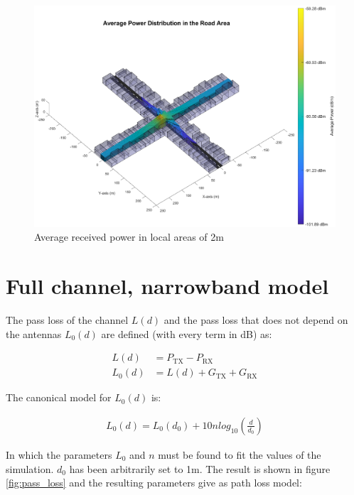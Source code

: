 \documentclass[10pt,a4paper]{ULBreport}
\begin{document}
\begin{figure}[H]
    \centering
    \includegraphics[width=1\textwidth]{3_5_alt.eps}
    \caption{Average received power in local areas of 2m}
    \label{fig:average_power_2m}
\end{figure}

\section{Full channel, narrowband model}

The pass loss of the channel $L(d)$ and the pass loss that does not depend on the antennas $L_0(d)$ are defined (with every term in dB) as:


\begin{subequations}
    \label{eq:pass_loss}
    \begin{align}
        L(d) &= P_{\text{TX}} - P_{\text{RX}}\\
        L_0(d) &= L(d) + G_{\text{TX}} + G_{\text{RX}}
    \end{align}
\end{subequations}

The canonical model for $L_0(d)$ is:

\begin{align*}
    L_0(d) = L_0(d_0) + 10 n log_{10} \left(\frac{d}{d_0}\right)
\end{align*}

In which the parameters $L_0$ and $n$ must be found to fit the values of the simulation. $d_0$ has been arbitrarily set to 1m. The result is shown in figure \ref{fig:pass_loss} and the resulting parameters give as path loss model:
\end{document}
